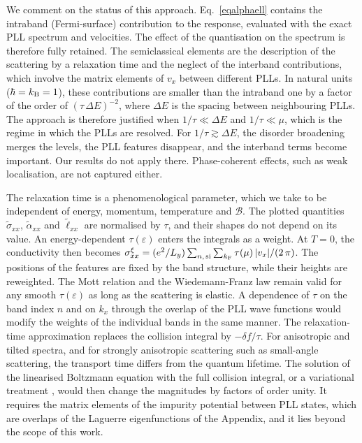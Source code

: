 \documentclass[aps,prb, onecolumn, nofootinbib, citeautoscript,10pt]{revtex4-2}
\begin{document}
We comment on the status of this approach. Eq.~\eqref{eqalphaell} contains the intraband (Fermi-surface) contribution to the response, evaluated with the exact PLL spectrum and velocities. The effect of the quantisation on the spectrum is therefore fully retained. The semiclassical elements are the description of the scattering by a relaxation time and the neglect of the interband contributions, which involve the matrix elements of $v_x$ between different PLLs. In natural units ($\hbar=k_{\rm B}=1$), these contributions are smaller than the intraband one by a factor of the order of $(\tau\,\Delta E)^{-2}$, where $\Delta E$ is the spacing between neighbouring PLLs. The approach is therefore justified when $1/\tau\ll\Delta E$ and $1/\tau\ll\mu$, which is the regime in which the PLLs are resolved. For $1/\tau\gtrsim\Delta E$, the disorder broadening merges the levels, the PLL features disappear, and the interband terms become important. Our results do not apply there. Phase-coherent effects, such as weak localisation, are not captured either.

The relaxation time is a phenomenological parameter, which we take to be independent of energy, momentum, temperature and $\mathcal B$. The plotted quantities $\tilde\sigma_{xx}$, $\tilde\alpha_{xx}$ and $\tilde\ell_{xx}$ are normalised by $\tau$, and their shapes do not depend on its value. An energy-dependent $\tau(\varepsilon)$ enters the integrals as a weight. At $T=0$, the conductivity then becomes $\sigma^\xi_{xx}=(e^2/L_y)\sum_{n,\,{\rm si}}\sum_{k_{\rm F}}\tau(\mu)\,|v_x|/(2\,\pi)$. The positions of the features are fixed by the band structure, while their heights are reweighted. The Mott relation and the Wiedemann-Franz law remain valid for any smooth $\tau(\varepsilon)$ as long as the scattering is elastic. A dependence of $\tau$ on the band index $n$ and on $k_x$ through the overlap of the PLL wave functions would modify the weights of the individual bands in the same manner. The relaxation-time approximation replaces the collision integral by $-\delta f/\tau$. For anisotropic and tilted spectra, and for strongly anisotropic scattering such as small-angle scattering, the transport time differs from the quantum lifetime. The solution of the linearised Boltzmann equation with the full collision integral, or a variational treatment \cite{ziman}, would then change the magnitudes by factors of order unity. It requires the matrix elements of the impurity potential between PLL states, which are overlaps of the Laguerre eigenfunctions of the Appendix, and it lies beyond the scope of this work.
\end{document}
